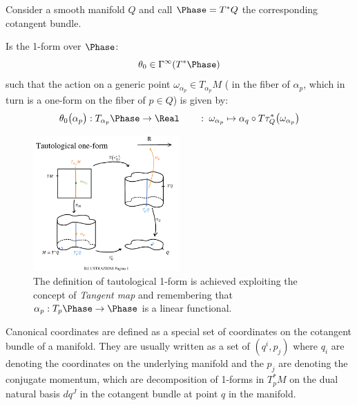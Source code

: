 \documentclass[Main]{subfiles}
\begin{document}
					Consider a smooth manifold $Q$ and call $\Phase=T^*Q$ the corresponding cotangent bundle.
					\begin{definition}
						Is the 1-form over $\Phase$:
						\begin{displaymath}
							\theta_0 \in \Gamma^\infty (T^*\Phase)
						\end{displaymath}
					such that the action on a generic point $ \omega_{\alpha_p} \in T_{\alpha_p}M$ ( in the fiber of $\alpha_p$, which in turn is a one-form on the fiber of $p\in Q$) is given by:
						\begin{displaymath}
						\theta_0 \big(\alpha_p \big): T_{\alpha_p}\Phase \rightarrow \Real \qquad : \; \omega_{\alpha_p} \mapsto \alpha_q \circ T \tau^*_Q \big( \omega_{\alpha_p} \big)
						\end{displaymath}
					\end{definition}
					\begin{figure}[h!]
   						\includegraphics[width=0.5\textwidth]{Pictures/Tautological1Form} 
 						\caption{The definition of tautological 1-form is achieved exploiting the concept of \emph{Tangent map} and remembering that $\alpha_p: T_p \Phase \rightarrow \Phase$ is a linear functional.} 
  						\centering
					\end{figure}	
	
					\begin{notationfix}
						Canonical coordinates are defined as a special set of coordinates on the cotangent bundle of a manifold. 
						They are usually written as a set of $(q^i,p_j)$ where ${q_i}$ are denoting the coordinates on the underlying manifold and the ${p_j}$ are denoting the conjugate momentum, which are decomposition of 1-forms in $T_p^*M$ on the dual natural basis $d q^J$ in the cotangent bundle at point $q$ in the manifold.
					\end{notationfix}
	
\end{document}
